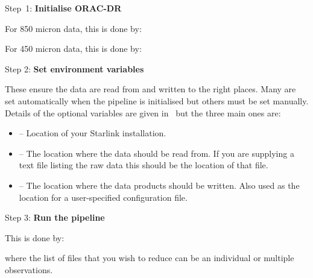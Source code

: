 \begin{aligndesc}
\item[Step~1:]
\textbf{Initialise ORAC-DR}

For 850 micron data, this is done by:
\begin{terminalv}
\end{terminalv}

\vspace{0.2cm}

For 450 micron data, this is done by:

\begin{terminalv}
\end{terminalv}

\vspace{0.2cm}

\item[Step 2:]
\textbf{Set environment variables}

These ensure the data are read from and written to the right
places. Many are set automatically when the pipeline is initialised
but others must be set manually. Details of the optional variables are
given in \pipelinesun\ but the three main ones are:

\begin{itemize}\itemsep-0.1em
\item {} -- Location of your Starlink installation.
\item {} -- The location where the data should be read from.
If you are supplying a text file listing the raw data this should be the
location of that file.
\item {} -- The location where the data products should be
written. Also used as the location for a user-specified configuration file.
\end{itemize}

\item[Step 3:]
\textbf{Run the pipeline}

This is done by:
\begin{terminalv}
\end{terminalv}

\vspace{0.2cm}

where the list of files that you wish to reduce can be
an individual or multiple observations.

\end{aligndesc}


